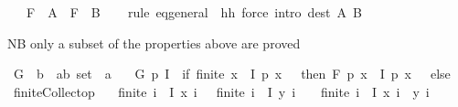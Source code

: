 \begin{isabellebody}
\ \ \ {\isachardoublequoteopen}F\ {\isasymphi}\ A\ {\isacharequal}{\kern0pt}\ F\ {\isasymgamma}\ B{\isachardoublequoteclose}\isanewline
%
\isadelimproof
\ \ %
\endisadelimproof
%
\isatagproof
{}\isamarkupfalse%
\ {\isacharparenleft}{\kern0pt}rule\ eq{\isacharunderscore}{\kern0pt}general\ {\isacharbrackleft}{\kern0pt}\ h{\isacharequal}{\kern0pt}h{\isacharbrackright}{\kern0pt}{\isacharparenright}{\kern0pt}\ {\isacharparenleft}{\kern0pt}force\ intro{\isacharcolon}{\kern0pt}\ dest{\isacharcolon}{\kern0pt}\ A\ B{\isacharparenright}{\kern0pt}{\isacharplus}{\kern0pt}%
\endisatagproof
{\isafoldproof}%
%
\isadelimproof
%
\endisadelimproof
%
\isadelimdocument
%
\endisadelimdocument
%
\isatagdocument
%
\isamarkuptrue%
%
\endisatagdocument
{\isafolddocument}%
%
\isadelimdocument
%
\endisadelimdocument
%
\begin{isamarkuptext}%
NB only a subset of the properties above are proved%
\end{isamarkuptext}\isamarkuptrue%
\isamarkupfalse%
\ G\ {\isacharcolon}{\kern0pt}{\isacharcolon}{\kern0pt}\ {\isachardoublequoteopen}{\isacharbrackleft}{\kern0pt}{\isacharprime}{\kern0pt}b\ {\isasymRightarrow}\ {\isacharprime}{\kern0pt}a{\isacharcomma}{\kern0pt}{\isacharprime}{\kern0pt}b\ set{\isacharbrackright}{\kern0pt}\ {\isasymRightarrow}\ {\isacharprime}{\kern0pt}a{\isachardoublequoteclose}\isanewline
\ \ \ {\isachardoublequoteopen}G\ p\ I\ {\isasymequiv}\ if\ finite\ {\isacharbraceleft}{\kern0pt}x\ {\isasymin}\ I{\isachardot}{\kern0pt}\ p\ x\ {\isasymnoteq}\ \ then\ F\ p\ {\isacharbraceleft}{\kern0pt}x\ {\isasymin}\ I{\isachardot}{\kern0pt}\ p\ x\ {\isasymnoteq}\ \ else\ \isanewline
\isanewline
{}\isamarkupfalse%
\ finite{\isacharunderscore}{\kern0pt}Collect{\isacharunderscore}{\kern0pt}op{\isacharcolon}{\kern0pt}\isanewline
\ \ \ {\isachardoublequoteopen}{\isasymlbrakk}finite\ {\isacharbraceleft}{\kern0pt}i\ {\isasymin}\ I{\isachardot}{\kern0pt}\ x\ i\ {\isasymnoteq}\ \ finite\ {\isacharbraceleft}{\kern0pt}i\ {\isasymin}\ I{\isachardot}{\kern0pt}\ y\ i\ {\isasymnoteq}\ \ {\isasymLongrightarrow}\ finite\ {\isacharbraceleft}{\kern0pt}i\ {\isasymin}\ I{\isachardot}{\kern0pt}\ x\ i\ \isactrlbold {\isacharasterisk}{\kern0pt}\ y\ i\ {\isasymnoteq}\ \isanewline

\end{isabellebody}
